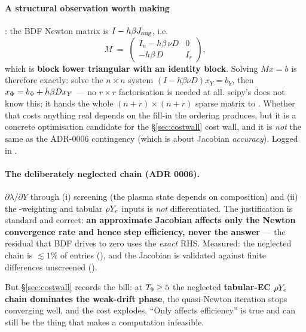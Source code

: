 \paragraph{A structural observation worth making}\derivedhere: the BDF Newton
matrix is $I - h\beta J_{\rm aug}$, i.e.
%
\begin{equation}
M \;=\; \begin{pmatrix} I_n - h\beta\,\nu D & 0\\
                        -h\beta\,D & I_r\end{pmatrix},
\label{eq:newtonmatrix}
\end{equation}
%
which is \textbf{block lower triangular with an identity block}. Solving
$Mx = b$ is therefore exactly: solve the $n\times n$ system
$(I - h\beta\nu D)x_Y = b_Y$, then $x_{\Phi} = b_{\Phi} + h\beta D x_Y$ --- no
$r\times r$ factorisation is needed at all. scipy's  does not know
this; it hands the whole $(n{+}r)\times(n{+}r)$ sparse matrix to .
Whether that costs anything real depends on the fill-in the ordering produces,
but it is a concrete optimisation candidate for the \S\ref{sec:costwall} cost
wall, and it is \emph{not} the same as the ADR-0006 contingency (which is about
Jacobian \emph{accuracy}). Logged in .

\paragraph{The deliberately neglected chain (ADR 0006).}
$\partial\lambda/\partial Y$ through (i) screening (the plasma state depends on
composition) and (ii) the \Ye-weighting and tabular $\rho Y_{e}$ inputs is
\emph{not} differentiated. The justification is standard and correct: \textbf{an
approximate Jacobian affects only the Newton convergence rate and hence step
efficiency, never the answer} --- the residual that BDF drives to zero uses the
\emph{exact} RHS. Measured: the neglected chain is $\lesssim 1\%$ of entries
(), and the Jacobian is
validated against finite differences unscreened
().

But \S\ref{sec:costwall} records the bill: at $T_{9} \ge 5$ the neglected
\textbf{tabular-EC $\rho Y_{e}$ chain dominates the weak-drift phase}, the
quasi-Newton iteration stops converging well, and the cost explodes. ``Only
affects efficiency'' is true and can still be the thing that makes a computation
infeasible.

